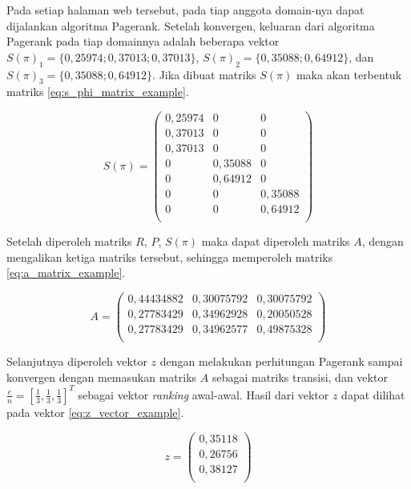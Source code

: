 Pada setiap halaman web tersebut, pada tiap anggota domain-nya dapat dijalankan algoritma Pagerank. Setelah konvergen, keluaran dari algoritma Pagerank pada tiap domainnya adalah beberapa vektor $S(\pi)_1 = \{0,25974; 0,37013;  0,37013\}$, $S(\pi)_2 = \{0,35088; 0,64912\}$, dan $S(\pi)_3 = \{0,35088; 0,64912\}$. Jika dibuat matriks $S(\pi)$ maka akan terbentuk matriks \ref{eq:s_phi_matrix_example}.

\begingroup
\makeatletter
\def\f@size{10}
\check@mathfonts
\begin{equation}
\label{eq:s_phi_matrix_example}
	S(\pi) =
	\begin{pmatrix}
		0,25974 & 0 & 0 \\
		0,37013 & 0 & 0 \\
		0,37013 & 0 & 0 \\
		0 & 0,35088 & 0 \\
		0 & 0,64912 & 0 \\
		0 & 0 & 0,35088 \\
		0 & 0 & 0,64912 \\
	\end{pmatrix}
\end{equation}
\endgroup

Setelah diperoleh matriks $R$, $P$, $S(\pi)$ maka dapat diperoleh matriks $A$, dengan mengalikan ketiga matriks tersebut, sehingga memperoleh matriks \ref{eq:a_matrix_example}.

\begin{equation}
\label{eq:a_matrix_example}
	A =
	\begin{pmatrix}
		0,44434882 & 0,30075792 & 0,30075792 \\
		0,27783429 & 0,34962928 & 0,20050528 \\
		0,27783429 & 0,34962577 & 0,49875328 \\
	\end{pmatrix}
\end{equation}

Selanjutnya diperoleh vektor $z$ dengan melakukan perhitungan Pagerank sampai konvergen dengan memasukan matriks $A$ sebagai matriks transisi, dan vektor $\frac{e}{n} = [\frac{1}{3}, \frac{1}{3}, \frac{1}{3}]^T$ sebagai vektor \textit{ranking} awal-awal. Hasil dari vektor $z$ dapat dilihat pada vektor \ref{eq:z_vector_example}.      

\begin{equation}
\label{eq:z_vector_example}
	z =
	\begin{pmatrix}
		0,35118 \\ 
		0,26756 \\ 
		0,38127 \\
	\end{pmatrix}
\end{equation}


